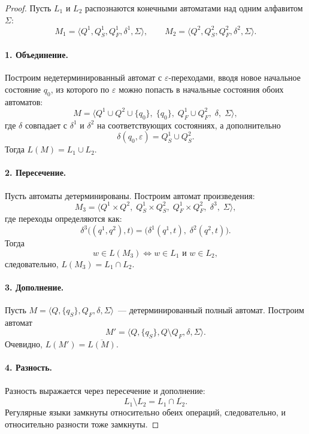 \begin{proof}
    Пусть $L_1$ и $L_2$ распознаются конечными автоматами над одним алфавитом $\Sigma$:
    \[
        M_1 = \langle Q^1, Q_S^1, Q_F^1, \delta^1, \Sigma \rangle, \qquad
        M_2 = \langle Q^2, Q_S^2, Q_F^2, \delta^2, \Sigma \rangle.
    \]


    \paragraph{1. Объединение.}
    Построим недетерминированный автомат с $\varepsilon$-переходами,
    вводя новое начальное состояние $q_0$, из которого по $\varepsilon$ можно попасть
    в начальные состояния обоих автоматов:
    \[
        M = \langle Q^1 \cup Q^2 \cup \{q_0\},\; \{q_0\},\; Q_F^1 \cup Q_F^2,\; \delta,\; \Sigma \rangle,
    \]
    где $\delta$ совпадает с $\delta^1$ и $\delta^2$ на соответствующих состояниях, а дополнительно
    \[
        \delta(q_0, \varepsilon) = Q_S^1 \cup Q_S^2.
    \]
    Тогда $L(M) = L_1 \cup L_2$.

    \paragraph{2. Пересечение.}
    Пусть автоматы детерминированы. Построим автомат произведения:
    \[
        M_3 = \langle Q^1 \times Q^2,\; Q_S^1 \times Q_S^2,\; Q_F^1 \times Q_F^2,\; \delta^3,\; \Sigma \rangle,
    \]
    где переходы определяются как:
    \[
        \delta^3\big((q^1, q^2), t\big) = \big(\delta^1(q^1, t),\; \delta^2(q^2, t)\big).
    \]
    Тогда%
    \[
        w \in L(M_3) \iff w \in L_1 \text{ и } w \in L_2,
    \]
    следовательно, $L(M_3) = L_1 \cap L_2$.

    \paragraph{3. Дополнение.}
    Пусть $M = \langle Q, \{q_S\}, Q_F, \delta, \Sigma \rangle$~--- детерминированный полный автомат.
    Построим автомат
    \[
        M' = \langle Q, \{q_S\}, Q \setminus Q_F, \delta, \Sigma \rangle.
    \]
    Очевидно, $L(M') = \overline{L(M)}$.

    \paragraph{4. Разность.}
    Разность выражается через пересечение и дополнение:
    \[
        L_1 \setminus L_2 = L_1 \cap \overline{L_2}.
    \]
    Регулярные языки замкнуты относительно обеих операций, следовательно, и относительно разности тоже замкнуты.
\end{proof}

